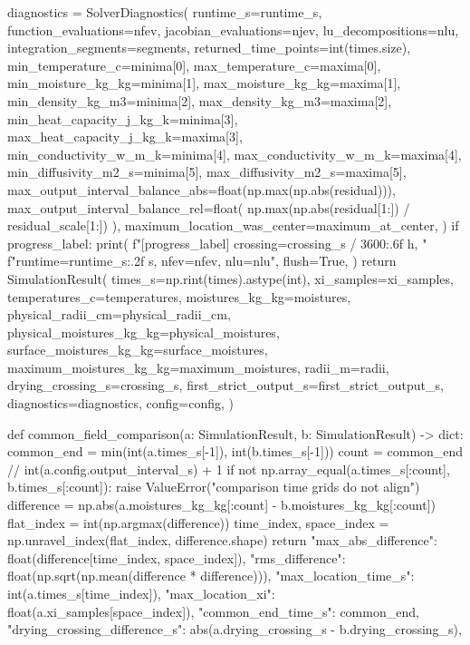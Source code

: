 \documentclass[withoutpreface,bwprint]{cumcmthesis}
\begin{document}
\begin{PythonCode}
    diagnostics = SolverDiagnostics(
        runtime_s=runtime_s,
        function_evaluations=nfev,
        jacobian_evaluations=njev,
        lu_decompositions=nlu,
        integration_segments=segments,
        returned_time_points=int(times.size),
        min_temperature_c=minima[0],
        max_temperature_c=maxima[0],
        min_moisture_kg_kg=minima[1],
        max_moisture_kg_kg=maxima[1],
        min_density_kg_m3=minima[2],
        max_density_kg_m3=maxima[2],
        min_heat_capacity_j_kg_k=minima[3],
        max_heat_capacity_j_kg_k=maxima[3],
        min_conductivity_w_m_k=minima[4],
        max_conductivity_w_m_k=maxima[4],
        min_diffusivity_m2_s=minima[5],
        max_diffusivity_m2_s=maxima[5],
        max_output_interval_balance_abs=float(np.max(np.abs(residual))),
        max_output_interval_balance_rel=float(
            np.max(np.abs(residual[1:]) / residual_scale[1:])
        ),
        maximum_location_was_center=maximum_at_center,
    )
    if progress_label:
        print(
            f"[{progress_label}] crossing={crossing_s / 3600:.6f} h, "
            f"runtime={runtime_s:.2f} s, nfev={nfev}, nlu={nlu}",
            flush=True,
        )
    return SimulationResult(
        times_s=np.rint(times).astype(int),
        xi_samples=xi_samples,
        temperatures_c=temperatures,
        moistures_kg_kg=moistures,
        physical_radii_cm=physical_radii_cm,
        physical_moistures_kg_kg=physical_moistures,
        surface_moistures_kg_kg=surface_moistures,
        maximum_moistures_kg_kg=maximum_moistures,
        radii_m=radii,
        drying_crossing_s=crossing_s,
        first_strict_output_s=first_strict_output_s,
        diagnostics=diagnostics,
        config=config,
    )


def common_field_comparison(a: SimulationResult, b: SimulationResult) -> dict:
    common_end = min(int(a.times_s[-1]), int(b.times_s[-1]))
    count = common_end // int(a.config.output_interval_s) + 1
    if not np.array_equal(a.times_s[:count], b.times_s[:count]):
        raise ValueError("comparison time grids do not align")
    difference = np.abs(a.moistures_kg_kg[:count] - b.moistures_kg_kg[:count])
    flat_index = int(np.argmax(difference))
    time_index, space_index = np.unravel_index(flat_index, difference.shape)
    return {
        "max_abs_difference": float(difference[time_index, space_index]),
        "rms_difference": float(np.sqrt(np.mean(difference * difference))),
        "max_location_time_s": int(a.times_s[time_index]),
        "max_location_xi": float(a.xi_samples[space_index]),
        "common_end_time_s": common_end,
        "drying_crossing_difference_s": abs(a.drying_crossing_s - b.drying_crossing_s),
    }



\end{PythonCode}
\end{document}
